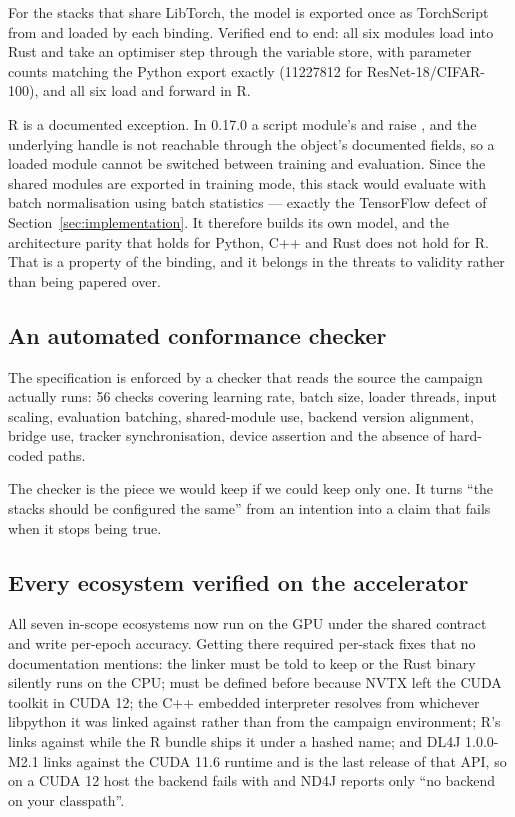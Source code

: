 For the stacks that share LibTorch, the model is exported once as TorchScript
from  and loaded by each binding. Verified end to end: all six
modules load into Rust and take an optimiser step through the variable store,
with parameter counts matching the Python export exactly
(\num{11227812} for ResNet-18/CIFAR-100), and all six load and forward in R.

R is a documented exception. In  0.17.0 a script module's
 and  raise , and the
underlying handle is not reachable through the object's documented fields, so a
loaded module cannot be switched between training and evaluation. Since the
shared modules are exported in training mode, this stack would evaluate with
batch normalisation using batch statistics --- exactly the TensorFlow defect of
Section~\ref{sec:implementation}. It therefore builds its own model, and the
architecture parity that holds for Python, C++ and Rust does not hold for R.
That is a property of the binding, and it belongs in the threats to validity
rather than being papered over.

\subsection{An automated conformance checker}

The specification is enforced by a checker that reads the source the campaign
actually runs: 56 checks covering learning rate, batch size, loader threads, input
scaling, evaluation batching, shared-module use, backend version alignment,
bridge use, tracker synchronisation, device assertion and the absence of
hard-coded paths.

The checker is the piece we would keep if we could keep only one. It turns
``the stacks should be configured the same'' from an intention into a claim that
fails when it stops being true.

\subsection{Every ecosystem verified on the accelerator}

All seven in-scope ecosystems now run on the GPU under the shared contract and
write per-epoch accuracy. Getting there required per-stack fixes that no
documentation mentions: the linker must be told to keep  or the
Rust binary silently runs on the CPU;  must be defined
before  because NVTX left the CUDA toolkit in CUDA 12;
the C++ embedded interpreter resolves  from whichever
libpython it was linked against rather than from the campaign environment; R's
 links against  while the R bundle ships
it under a hashed name; and DL4J 1.0.0-M2.1 links against the CUDA 11.6 runtime
and is the last release of that API, so on a CUDA 12 host the backend fails with
 and ND4J reports only
``no backend on your classpath''.

